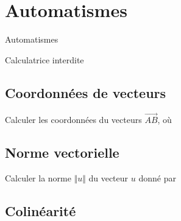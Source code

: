 
\AdvanceDate[1]



\section{Automatismes}

\begin{frame}

\centering \huge
Automatismes

\large
Calculatrice interdite

\end{frame}

\subsection{Coordonnées de vecteurs}

\begin{frame}{1}	
	Calculer les coordonnées du vecteurs $\overrightarrow{AB}$, où
\end{frame}

\subsection{Norme vectorielle}

\begin{frame}{2}

	Calculer la norme $\Vert u \Vert$ du vecteur $u$ donné par
		
	\boxAB{
		\[ u = \begin{pmatrix} 1 \\ -2 \end{pmatrix}. \]
	}{
		\[ u = \begin{pmatrix} 3  \\ -4 \end{pmatrix}. \]
	}
\end{frame}

\subsection{Colinéarité}

